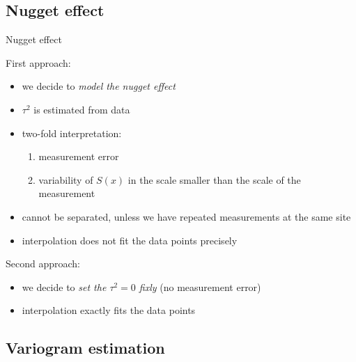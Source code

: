 \documentclass[
  ignorenonframetext,
]{beamer}
\providecommand{\tightlist}{%
  \setlength{\itemsep}{0pt}\setlength{\parskip}{0pt}}
\begin{document}
\hypertarget{nugget-effect-1}{%
\subsection{Nugget effect}\label{nugget-effect-1}}

\begin{frame}{Nugget effect}
\small

First approach:

\begin{itemize}
\tightlist
\item
  we decide to \emph{model the nugget effect}
\item
  \(\tau^2\) is estimated from data
\item
  two-fold interpretation:

  \begin{enumerate}
  \tightlist
  \item
    measurement error
  \item
    variability of \(S(x)\) in the scale smaller than the scale of the
    measurement
  \end{enumerate}
\item
  cannot be separated, unless we have repeated measurements at the same
  site
\item
  interpolation does not fit the data points precisely
\end{itemize}

Second approach:

\begin{itemize}
\tightlist
\item
  we decide to \emph{set the \(\tau^2=0\) fixly} (no measurement error)
\item
  interpolation exactly fits the data points
\end{itemize}
\end{frame}

\hypertarget{variogram-estimation}{%
\subsection{Variogram estimation}\label{variogram-estimation}}
\end{document}
